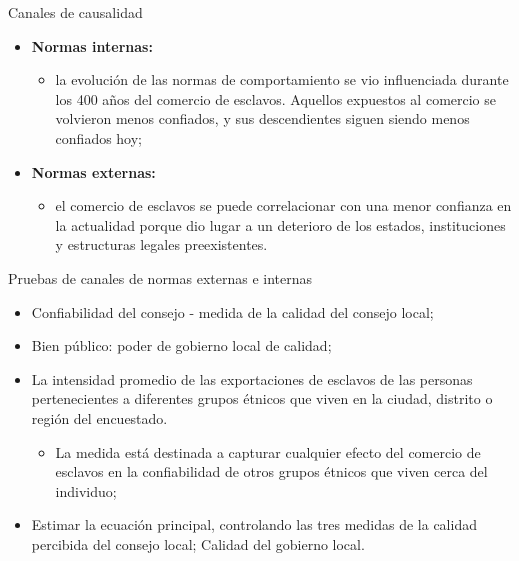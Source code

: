 \documentclass[11pt, aspectratio=169, compress]{beamer}
\begin{document}
\begin{frame}{Canales de causalidad}
\begin{itemize}
	\item \textbf{Normas internas: }
	\begin{itemize}
		\item 	la evolución de las normas de comportamiento se vio influenciada durante los 400 años del comercio de esclavos. Aquellos expuestos al comercio se volvieron menos confiados, y sus descendientes siguen siendo menos confiados hoy;
	\end{itemize}
	\item \textbf{Normas externas: }
	\begin{itemize}
		\item el comercio de esclavos se puede correlacionar con una menor confianza en la actualidad porque dio lugar a un deterioro de los estados, instituciones y estructuras legales preexistentes. 
	\end{itemize}
\end{itemize}
\end{frame}
\begin{frame}{Pruebas de canales de normas externas e internas}
	\begin{itemize}
		\item Confiabilidad del consejo - medida de la calidad del consejo local;
		\item Bien público: poder de gobierno local de calidad;
		\item La intensidad promedio de las exportaciones de esclavos de las personas pertenecientes a diferentes grupos étnicos que viven en la ciudad, distrito o región del encuestado. 
		\begin{itemize}
			\item La medida está destinada a capturar cualquier efecto del comercio de esclavos en la confiabilidad de otros grupos étnicos que viven cerca del individuo;
		\end{itemize}
		\item Estimar la ecuación principal, controlando las tres medidas de la calidad percibida del consejo local; Calidad del gobierno local.
	\end{itemize}
\end{frame}
\end{document}
